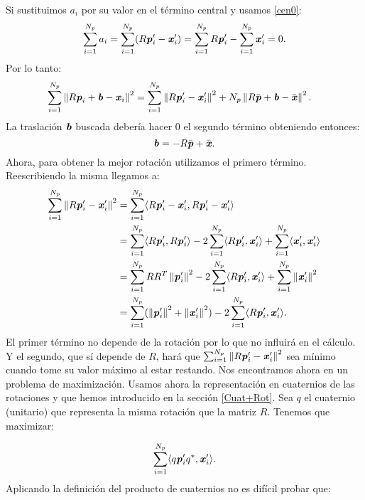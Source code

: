 		Si sustituimos $ a_i $ por su valor en el término central y usamos \eqref{cen0}:
		\begin{equation*}
			\sum_{i = 1}^{N_p} a_i = \sum_{i = 1}^{N_p} (R\textbf{\emph{p}}_i' -\textbf{\emph{x}}_i') = \sum_{i = 1}^{N_p} R\textbf{\emph{p}}_i' - \sum_{i = 1}^{N_p}\textbf{\emph{x}}_i' = 0.
		\end{equation*} 
		Por lo tanto: 
		\begin{equation*}
		\begin{split}
		\sum_{i = 1}^{N_p} \left\Vert R\textbf{\emph{p}}_i + \textbf{\emph{b}} - \textbf{\emph{x}}_i\right\Vert^2 &= \sum_{i = 1}^{N_p} \left\Vert R\textbf{\emph{p}}_i' -\textbf{\emph{x}}_i'\right\Vert^2 + N_p\left\Vert R\bar{\textbf{\emph{p}}}  + \textbf{\emph{b}} - \bar{\textbf{\emph{x}}}\right\Vert^2.
		\end{split}
		\end{equation*} 
		La traslación $ \textbf{\emph{b}} $ buscada debería hacer 0 el segundo término obteniendo entonces:
		\[\textbf{\emph{b}} =- R\bar{\textbf{\emph{p}}}  + \bar{\textbf{\emph{x}}}.
		\]
		Ahora, para obtener la mejor rotación utilizamos el primero término. Reescribiendo la misma llegamos a:
		\begin{equation*}
		\begin{split}
		\sum_{i = 1}^{N_p} \left\Vert R\textbf{\emph{p}}_i' -\textbf{\emph{x}}_i'\right\Vert^2 &= \sum_{i = 1}^{N_p} \langle R\textbf{\emph{p}}_i' -\textbf{\emph{x}}_i', R\textbf{\emph{p}}_i' -\textbf{\emph{x}}_i' \rangle \\
		&= \sum_{i=1}^{N_p} \langle R \textbf{\emph{p}}_i' , R \textbf{\emph{p}}_i' \rangle - 2\sum_{i=1}^{N_p}\langle R\textbf{\emph{p}}_i', \textbf{\emph{x}}_i'\rangle + \sum_{i=1}^{N_p} \langle \textbf{\emph{x}}_i', \textbf{\emph{x}}_i'\rangle \\
		&= \sum_{i=1}^{N_p} RR^T \left\Vert\textbf{\emph{p}}_i'\right\Vert^2 - 2\sum_{i=1}^{N_p}\langle R\textbf{\emph{p}}_i', \textbf{\emph{x}}_i'\rangle + \sum_{i=1}^{N_p} \left\Vert\textbf{\emph{x}}_i'\right\Vert^2\\
		&= \sum_{i=1}^{N_p} (\left\Vert\textbf{\emph{p}}_i'\right\Vert^2 + \left\Vert\textbf{\emph{x}}_i'\right\Vert^2)- 2\sum_{i=1}^{N_p}\langle R\textbf{\emph{p}}_i', \textbf{\emph{x}}_i'\rangle.
		\end{split}
		\end{equation*}
		El primer término no depende de la rotación por lo que no influirá en el cálculo. Y el segundo, que sí depende de $ R $, hará que  $ \sum_{i = 1}^{N_p} \left\Vert R\textbf{\emph{p}}_i' -\textbf{\emph{x}}_i'\right\Vert^2 $ sea mínimo cuando tome su valor máximo al estar restando. Nos encontramos ahora en un problema de maximización. Usamos ahora la representación en cuaternios de las rotaciones y que hemos introducido en la sección \ref{Cuat+Rot}. Sea $ q  $ el cuaternio (unitario) que representa la misma rotación que la matriz $ R $. Tenemos que maximizar:
		
		\begin{equation*}
		\sum_{i=1}^{N_p}\langle q\textbf{\emph{p}}_i'q^*, \textbf{\emph{x}}_i'\rangle.
		\end{equation*}
		Aplicando la definición del producto de cuaternios no es difícil probar que: 
		
